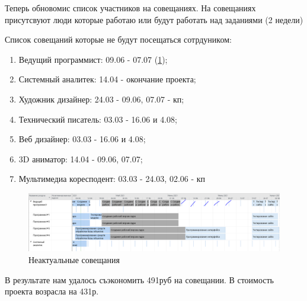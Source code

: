Теперь обновомис список участников на совещаниях.
На совещаниях присутсвуют люди которые работаю или будут работать над заданиями (2 недели)

Список совещаний которые не будут посещаться сотрдуником:
\begin{enumerate}
	\item Ведущий программист: 09.06 - 07.07 (\ref{fig:410});
	\item Системный аналитек: 14.04 - окончание проекта;
	\item Художник дизайнер: 24.03 - 09.06, 07.07 - кп;
	\item Технический писатель: 03.03 - 16.06 и 4.08;
	\item Веб дизайнер: 03.03 - 16.06 и 4.08;
	\item 3D аниматор: 14.04 - 09.06, 07.07;
	\item Мультимедиа коресподент: 03.03 - 24.03, 02.06 - кп
\end{enumerate}

\begin{figure}[H]
	\centering
	\includegraphics[width=0.7\linewidth]{src/4_10}
	\caption{Неактуальные совещания}
	\label{fig:410}
\end{figure}

В результате нам удалось съэкономить 491руб на совещании. 
В стоимость проекта возрасла на 431р.

